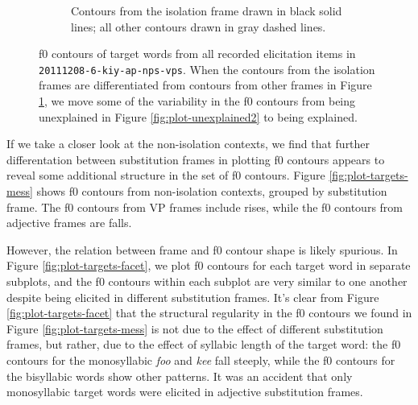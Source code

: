 \documentclass[12pt]{article}
\begin{document}
\begin{figure}[h]
\begin{subfigure}[t]{0.48\textwidth}
    \caption{Contours from the isolation frame drawn in black solid
      lines;
      all other contours drawn in gray dashed lines.}
    \label{fig:plot-iso}
  \end{subfigure}
  \caption{f0 contours of target words from all recorded elicitation
    items in \texttt{20111208-6-kiy-ap-nps-vps}. When the contours
    from the isolation frames are differentiated from contours from
    other frames in Figure
    \ref{fig:plot-iso}, we move some of the variability in the f0
    contours from being unexplained in
    Figure \ref{fig:plot-unexplained2} to being explained.}\label{fig:messes}
\end{figure}

If we take a closer look at the non-isolation contexts, we find that
further differentation between substitution frames in plotting f0
contours appears to reveal some additional structure in the set of f0
contours. Figure \ref{fig:plot-targets-mess} shows f0 contours from
non-isolation contexts, grouped by substitution frame. The f0 contours
from VP frames include rises, while the f0 contours from adjective
frames are falls. 

However, the relation between frame and f0 contour shape is likely
spurious. In Figure \ref{fig:plot-targets-facet}, we plot f0 contours
for each target word in separate subplots, and the f0 contours within
each subplot are very similar to one another despite being elicited in
different substitution frames. It's clear from Figure
\ref{fig:plot-targets-facet} that the structural regularity in the f0
contours we found in Figure \ref{fig:plot-targets-mess} is not due to
the effect of different substitution frames, but rather, due to the
effect of syllabic length of the target word: the f0 contours for the
monosyllabic \textit{foo} and \textit{kee} fall steeply, while the f0 contours
for the bisyllabic words show other patterns. It was an accident that
only monosyllabic target words were elicited in adjective substitution
frames. 
\end{document}
